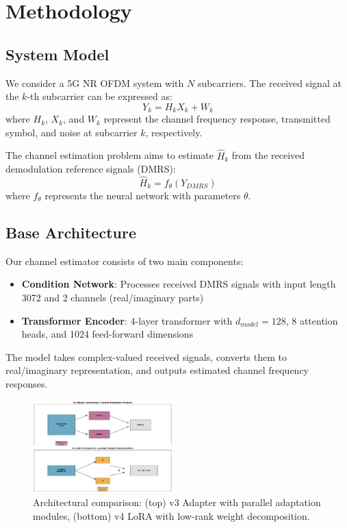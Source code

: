 \documentclass[conference]{IEEEtran}
\begin{document}
\section{Methodology}

\subsection{System Model}

We consider a 5G NR OFDM system with $N$ subcarriers. The received signal at the $k$-th subcarrier can be expressed as:
\begin{equation}
Y_k = H_k X_k + W_k
\end{equation}
where $H_k$, $X_k$, and $W_k$ represent the channel frequency response, transmitted symbol, and noise at subcarrier $k$, respectively.

The channel estimation problem aims to estimate $\hat{H}_k$ from the received demodulation reference signals (DMRS):
\begin{equation}
\hat{H}_k = f_{\theta}(Y_{DMRS})
\end{equation}
where $f_{\theta}$ represents the neural network with parameters $\theta$.

\subsection{Base Architecture}

Our channel estimator consists of two main components:
\begin{itemize}
\item \textbf{Condition Network}: Processes received DMRS signals with input length 3072 and 2 channels (real/imaginary parts)
\item \textbf{Transformer Encoder}: 4-layer transformer with $d_{model}=128$, 8 attention heads, and 1024 feed-forward dimensions
\end{itemize}

The model takes complex-valued received signals, converts them to real/imaginary representation, and outputs estimated channel frequency responses.

\begin{figure}[t]
\centering
\includegraphics[width=0.48\textwidth]{figures/architecture_comparison.pdf}
\caption{Architectural comparison: (top) v3 Adapter with parallel adaptation modules, (bottom) v4 LoRA with low-rank weight decomposition.}
\label{fig:architecture}
\end{figure}
\end{document}
